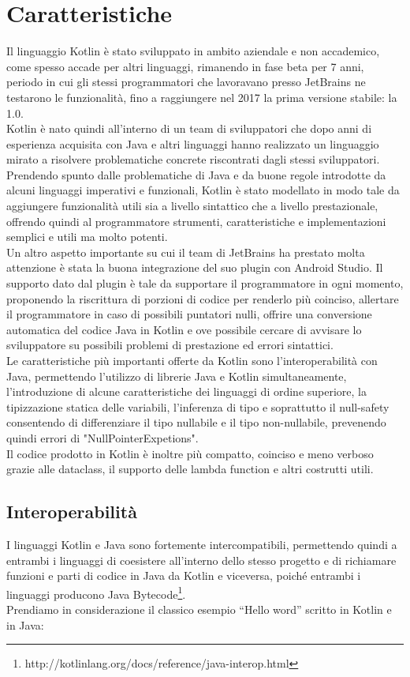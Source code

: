 \section{Caratteristiche}
Il linguaggio Kotlin è stato sviluppato in ambito aziendale e non accademico, come spesso accade per altri linguaggi, rimanendo in fase beta per 7 anni, periodo in cui gli stessi programmatori che lavoravano presso JetBrains ne testarono le funzionalità, fino a raggiungere nel 2017 la prima versione stabile: la 1.0. \\
Kotlin è nato quindi all'interno di un team di sviluppatori che dopo anni di esperienza acquisita con Java e altri linguaggi hanno realizzato un linguaggio mirato a risolvere problematiche concrete riscontrati dagli stessi sviluppatori.\\
Prendendo spunto dalle problematiche di Java e da buone regole introdotte da alcuni linguaggi imperativi e funzionali, Kotlin è stato modellato in modo tale da aggiungere funzionalità utili sia a livello sintattico che a livello prestazionale, offrendo quindi al programmatore strumenti, caratteristiche e implementazioni semplici e utili ma molto potenti.\\
Un altro aspetto importante su cui il team di JetBrains ha prestato molta attenzione è stata la buona integrazione del suo plugin con Android Studio. Il supporto dato dal plugin è tale da supportare il programmatore in ogni momento, proponendo la riscrittura di porzioni di codice per renderlo più coinciso, allertare il programmatore in caso di possibili puntatori nulli, offrire una conversione automatica del codice Java in Kotlin e ove possibile cercare di avvisare lo sviluppatore su possibili problemi di prestazione ed errori sintattici.\\
Le caratteristiche più importanti offerte da Kotlin sono l'interoperabilità con Java, permettendo l'utilizzo di librerie Java e Kotlin simultaneamente, l'introduzione di alcune caratteristiche dei linguaggi di ordine superiore, la tipizzazione statica delle variabili, l'inferenza di tipo e soprattutto il null-safety consentendo di differenziare il tipo nullabile e il tipo non-nullabile, prevenendo quindi errori di "NullPointerExpetions".\\
Il codice prodotto in Kotlin \`e inoltre più compatto, coinciso e meno verboso grazie alle dataclass, il supporto delle lambda function e altri costrutti utili.


\subsection{Interoperabilità}
I linguaggi Kotlin e Java sono fortemente intercompatibili, permettendo quindi a entrambi i linguaggi di coesistere all'interno dello stesso progetto e di richiamare funzioni e parti di codice in Java da Kotlin e viceversa, poiché entrambi i linguaggi producono Java Bytecode\footnote{http://kotlinlang.org/docs/reference/java-interop.html}.\\
Prendiamo in considerazione il classico esempio ``Hello word'' scritto in Kotlin e in Java:

